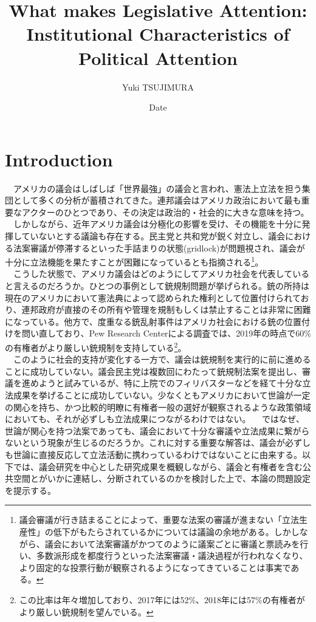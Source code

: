 \documentclass{article}
\title{What makes Legislative Attention: Institutional Characteristics of Political Attention}
\author{Yuki TSUJIMURA}
\date{Date}
\begin{document}
\maketitle

\section{Introduction}
　アメリカの議会はしばしば「世界最強」の議会\citep*{2004-cr}と言われ、憲法上立法を担う集団として多くの分析が蓄積されてきた。連邦議会はアメリカ政治において最も重要なアクターのひとつであり、その決定は政治的・社会的に大きな意味を持つ。\\
　しかしながら、近年アメリカ議会は分極化の影響を受け、その機能を十分に発揮していないとする議論も存在する。民主党と共和党が鋭く対立し、議会における法案審議が停滞するといった手詰まりの状態(gridlock)が問題視され、議会が十分に立法機能を果たすことが困難になっているとも指摘される\footnote{議会審議が行き詰まることによって、重要な法案の審議が進まない「立法生産性」の低下がもたらされているかについては議論の余地がある。\citep*{}しかしながら、議会において法案審議がかつてのように議案ごとに審議と票読みを行い、多数派形成を都度行うといった法案審議・議決過程が行われなくなり、より固定的な投票行動が観察されるようになってきていることは事実である。\citep*{Poole2017-ir,Layman2006-tg}}。\\
　こうした状態で、アメリカ議会はどのようにしてアメリカ社会を代表していると言えるのだろうか。ひとつの事例として銃規制問題が挙げられる。銃の所持は現在のアメリカにおいて憲法典によって認められた権利として位置付けられており、連邦政府が直接のその所有や管理を規制もしくは禁止することは非常に困難になっている。他方で、度重なる銃乱射事件はアメリカ社会における銃の位置付けを問い直しており、Pew Research Centerによる調査では、2019年の時点で60\%の有権者がより厳しい銃規制を支持している\footnote{この比率は年々増加しており、2017年には52\%、2018年には57\%の有権者がより厳しい銃規制を望んでいる。}。\citep*{Schaeffer2019-ld}\\
　このように社会的支持が変化する一方で、議会は銃規制を実行的に前に進めることに成功していない。議会民主党は複数回にわたって銃規制法案を提出し、審議を進めようと試みているが、特に上院でのフィリバスターなどを経て十分な立法成果を挙げることに成功していない。少なくともアメリカにおいて世論が一定の関心を持ち、かつ比較的明瞭に有権者一般の選好が観察されるような政策領域においても、それが必ずしも立法成果につながるわけではない。
　ではなぜ、世論が関心を持つ法案であっても、議会において十分な審議や立法成果に繋がらないという現象が生じるのだろうか。これに対する重要な解答は、議会が必ずしも世論に直接反応して立法活動に携わっているわけではないことに由来する。以下では、議会研究を中心とした研究成果を概観しながら、議会と有権者を含む公共空間とがいかに連結し、分断されているのかを検討した上で、本論の問題設定を提示する。
\end{document}
